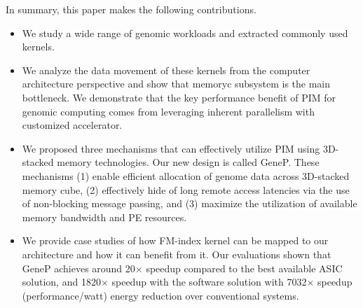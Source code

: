 In summary, this paper makes the following contributions.

\begin{itemize}
    \item We study a wide range of genomic workloads and extracted commonly used kernels.
    
    \item We analyze the data movement of these kernels from the computer architecture perspective and show that memoryc subsystem is the main bottleneck. We demonstrate that the key performance benefit of PIM for genomic computing comes from leveraging inherent parallelism with customized accelerator.
    
    \item We proposed three mechanisms that can effectively utilize PIM using 3D-stacked memory technologies. Our new design is called GeneP. These mechanisms (1) enable efficient allocation of genome data across 3D-stacked memory cube, (2) effectively hide of long remote access latencies via the use of non-blocking message passing, and (3) maximize the utilization of available memory bandwidth and PE resources.
    
    \item We provide case studies of how FM-index kernel can be mapped to our architecture and how it can benefit from it. Our evaluations shown that GeneP achieves around 20$\times$ speedup compared to the best available ASIC solution, and 1820$\times$ speedup with the software solution with 7032$\times$ speedup (performance/watt) energy reduction over conventional systems.
\end{itemize}